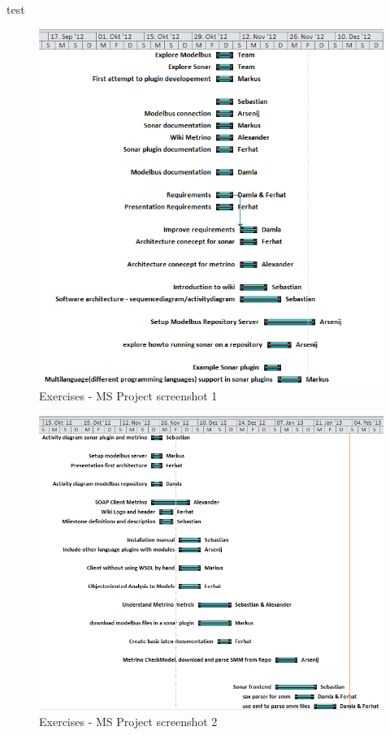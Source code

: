 \newpage

test

\newpage

\begin{figure}[htb]
\begin{center}
\includegraphics[width=\textwidth]{msp_part1}
\caption{Exercises - MS Project screenshot 1}
\end{center}
\end{figure}

\newpage

\begin{figure}[htb]
\begin{center}
\includegraphics[width=\textwidth]{msp_part2}
\caption{Exercises - MS Project screenshot 2}
\end{center}
\end{figure}

